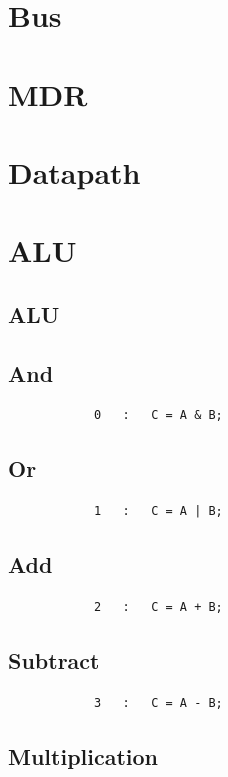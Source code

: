 \documentclass{article}
\begin{document}
\section{Bus} \label{Bus}
    
\section{MDR}\label{MDR}
    
\section{Datapath} \label{Datapath}
    
\section{ALU} \label{ALU}
    \subsection{ALU}
        
    \subsection{And}
        \begin{lstlisting}
            0   :   C = A & B;
        \end{lstlisting}
    \subsection{Or}
        \begin{lstlisting}
			1   :   C = A | B;
        \end{lstlisting}
    \subsection{Add}
        \begin{lstlisting}
            2   :   C = A + B;
        \end{lstlisting}
    \subsection{Subtract}
        \begin{lstlisting}
			3   :   C = A - B;
        \end{lstlisting}
    \subsection{Multiplication}
        
\end{document}
